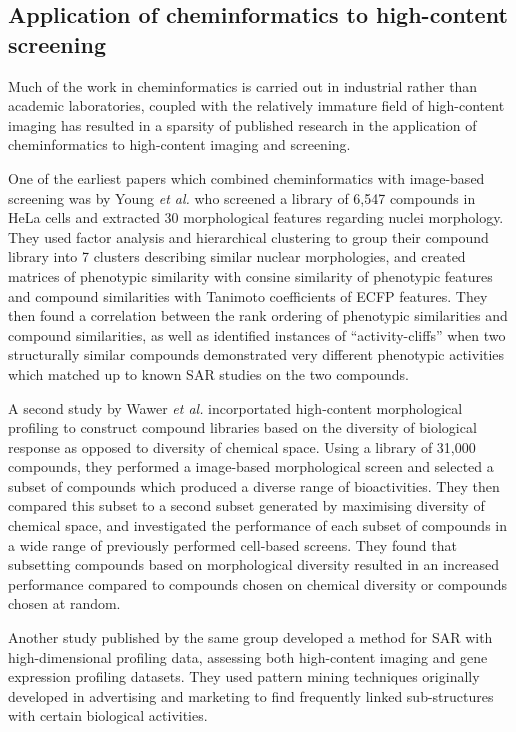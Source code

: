\documentclass[a4paper,11pt,twoside,openright]{scrbook}
\begin{document}
\subsection{Application of cheminformatics to high-content screening}
Much of the work in cheminformatics is carried out in industrial rather than academic laboratories, coupled with the relatively immature field of high-content imaging has resulted in a sparsity of published research in the application of cheminformatics to high-content imaging and screening.

One of the earliest papers which combined cheminformatics with image-based screening was by Young \textit{et al.}\cite{Young2008} who screened a library of 6,547 compounds in HeLa cells and extracted 30 morphological features regarding nuclei morphology.
They used factor analysis and hierarchical clustering to group their compound library into 7 clusters describing similar nuclear morphologies, and created matrices of phenotypic similarity with consine similarity of phenotypic features and compound similarities with Tanimoto coefficients of ECFP features.
They then found a correlation between the rank ordering of phenotypic similarities and compound similarities, as well as identified instances of ``activity-cliffs'' when two structurally similar compounds demonstrated very different phenotypic activities which matched up to known SAR studies on the two compounds.

A second study by Wawer \textit{et al.}\cite{Wawer2014b} incorportated high-content morphological profiling to construct compound libraries based on the diversity of biological response as opposed to diversity of chemical space.
Using a library of 31,000 compounds, they performed a image-based morphological screen and selected a subset of compounds which produced a diverse range of bioactivities.
They then compared this subset to a second subset generated by maximising diversity of chemical space, and investigated the performance of each subset of compounds in a wide range of previously performed cell-based screens.
They found that subsetting compounds based on morphological diversity resulted in an increased performance compared to compounds chosen on chemical diversity or compounds chosen at random.

Another study published by the same group developed a method for SAR with high-dimensional profiling data, assessing both high-content imaging and gene expression profiling datasets.
They used pattern mining techniques originally developed in advertising and marketing to find frequently linked sub-structures with certain biological activities. \cite{Wawer2014c}
\end{document}
